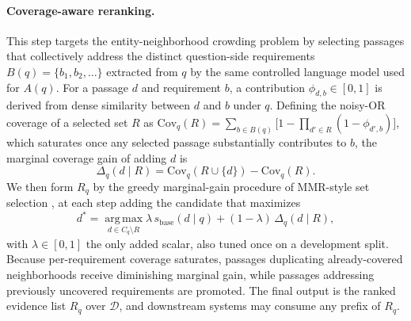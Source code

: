 \paragraph{Coverage-aware reranking.}
This step targets the entity-neighborhood crowding problem by
selecting passages that collectively address the distinct
question-side requirements $B(q)=\{b_1,b_2,\ldots\}$ extracted from
$q$ by the same controlled language model used for $A(q)$. For a
passage $d$ and requirement $b$, a contribution
$\phi_{d,b}\in[0,1]$ is derived from dense similarity between $d$
and $b$ under $q$. Defining the noisy-OR coverage of a selected set
$R$ as $\mathrm{Cov}_q(R)=\sum_{b\in B(q)}\bigl[1-\prod_{d'\in R}(1-\phi_{d',b})\bigr]$,
which saturates once any selected passage substantially contributes
to $b$, the marginal coverage gain of adding $d$ is
\begin{equation}
\label{eq:marginal-gain}
\Delta_q(d \mid R) = \mathrm{Cov}_q(R\cup\{d\}) - \mathrm{Cov}_q(R).
\end{equation}
We then form $R_q$ by the greedy marginal-gain procedure of MMR-style set selection
\citep{carbonell1998mmr,lin2011submodular}, at each step adding the
candidate that maximizes
\begin{equation}
\label{eq:greedy-rerank}
d^{*}
=
\operatorname*{arg\,max}_{d \in C_q \setminus R}
\lambda\,s_{\mathrm{base}}(d \mid q)
+
(1-\lambda)\,\Delta_q(d \mid R),
\end{equation}
with $\lambda \in [0,1]$ the only added scalar, also tuned once on a
development split. Because per-requirement coverage saturates,
passages duplicating already-covered neighborhoods receive
diminishing marginal gain, while passages addressing previously
uncovered requirements are promoted. The final output is the ranked
evidence list $R_q$ over $\mathcal{D}$, and downstream systems may
consume any prefix of $R_q$.
